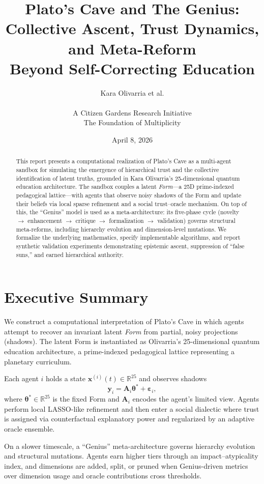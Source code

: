 \documentclass[11pt]{article}
\title{Plato's Cave and The Genius:\\
Collective Ascent, Trust Dynamics, and Meta-Reform \\ Beyond Self-Correcting Education}
\author{Kara Olivarria et al. \\ \\ A Citizen Gardens Research Initiative \\ The Foundation of Multiplicity}
\date{April 8, 2026}
\begin{document}
\maketitle

\begin{abstract}
This report presents a computational realization of Plato's Cave as a
multi-agent sandbox for simulating the emergence of hierarchical trust
and the collective identification of latent truths, grounded in
Kara Olivarria's 25-dimensional quantum education architecture.
The sandbox couples a latent \emph{Form}---a 25D prime-indexed
pedagogical lattice---with agents that observe noisy shadows of the Form
and update their beliefs via local sparse refinement and a social
trust--oracle mechanism.
On top of this, the ``Genius'' model is used as a meta-architecture:
its five-phase cycle (novelty $\rightarrow$ enhancement $\rightarrow$
critique $\rightarrow$ formalization $\rightarrow$ validation) governs
structural meta-reforms, including hierarchy evolution and
dimension-level mutations.
We formalize the underlying mathematics, specify implementable
algorithms, and report synthetic validation experiments demonstrating
epistemic ascent, suppression of ``false suns,'' and earned hierarchical
authority.
\end{abstract}
\newpage
\tableofcontents
\newpage
\section{Executive Summary}

We construct a computational interpretation of Plato's Cave in which
agents attempt to recover an invariant latent \emph{Form} from partial,
noisy projections (shadows).
The latent Form is instantiated as Olivarria's 25-dimensional quantum
education architecture, a prime-indexed pedagogical lattice
representing a planetary curriculum.

Each agent $i$ holds a state $\bm{x}^{(i)}(t) \in \mathbb{R}^{25}$ and
observes shadows
\[
  \bm{y}_i = \bm{A}_i \bm{\theta}^* + \bm{\varepsilon}_i,
\]
where $\bm{\theta}^* \in \mathbb{R}^{25}$ is the fixed Form and
$\bm{A}_i$ encodes the agent's limited view.
Agents perform local LASSO-like refinement and then
enter a social dialectic where trust is assigned via
counterfactual explanatory power and regularized by an adaptive oracle
ensemble.

On a slower timescale, a ``Genius'' meta-architecture governs
hierarchy evolution and structural mutations.
Agents earn higher tiers through an impact--atypicality index, and
dimensions are added, split, or pruned when Genius-driven metrics
over dimension usage and oracle contributions cross thresholds.
\end{document}
